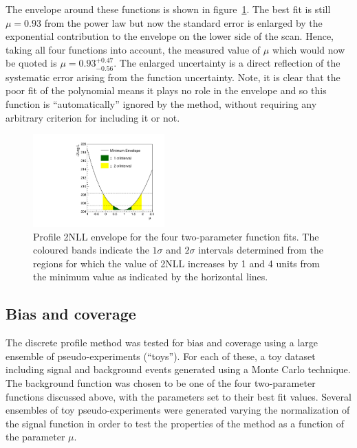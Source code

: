 The envelope around these functions is shown in
figure~\ref{fig:functions:envelope}.
The best fit is still $\mu=0.93$ from the power law
but now the standard error is enlarged by the exponential contribution to the
envelope on the lower side of the scan. Hence, taking all four functions into
account, the measured value of $\mu$ which would now be quoted is 
$\mu = 0.93_{-0.56}^{+0.47}$. The enlarged uncertainty is a direct reflection of the
systematic error arising from the function uncertainty. Note,
it is clear that the poor fit of the polynomial
means it plays no role in the envelope and so this function is 
``automatically'' ignored by the method,
without requiring any arbitrary criterion for
including it or not.
%
\begin{figure}[tbp]
\centering
\includegraphics[width=0.45\textwidth]{functions/Envelope.pdf}
\caption{Profile 2NLL envelope for the four two-parameter function fits.
The coloured bands indicate the $1\sigma$ and $2\sigma$ intervals determined from the regions 
for which the value of 2NLL increases by 1 and 4 units from the minimum value as indicated by the horizontal lines.}
\label{fig:functions:envelope}
\end{figure}


\subsection{Bias and coverage}
\label{sec:functions:coverage}

The discrete profile method was tested for bias and coverage 
using a large ensemble of
pseudo-experiments (``toys''). For each of these, a toy
dataset including signal and background events generated using a Monte Carlo technique. 
The background function was chosen to be one of the four two-parameter functions discussed above, with
the parameters set to their best fit values. Several ensembles of toy pseudo-experiments were 
generated varying the normalization of the signal function in order to test the properties 
of the method as a function of the parameter $\mu$.  

